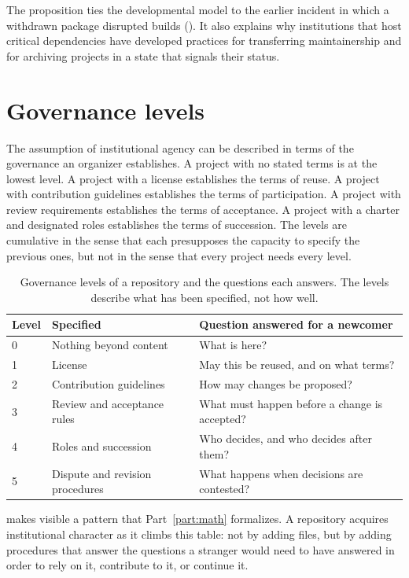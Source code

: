 \documentclass[11pt,twoside,openright]{book}
\theoremstyle{plain}
\theoremstyle{definition}
\theoremstyle{remark}
\begin{document}
The proposition ties the developmental model to the earlier incident in which a withdrawn package disrupted builds (). It also explains why institutions that host critical dependencies have developed practices for transferring maintainership and for archiving projects in a state that signals their status.

\section{Governance levels}

The assumption of institutional agency can be described in terms of the governance an organizer establishes. A project with no stated terms is at the lowest level. A project with a license establishes the terms of reuse. A project with contribution guidelines establishes the terms of participation. A project with review requirements establishes the terms of acceptance. A project with a charter and designated roles establishes the terms of succession. The levels are cumulative in the sense that each presupposes the capacity to specify the previous ones, but not in the sense that every project needs every level.

\begin{table}[t]
\centering
\caption{Governance levels of a repository and the questions each answers. The levels describe what has been specified, not how well.}
\label{tab:govlevels}
\small
\begin{tabular}{lll}
\toprule
Level & Specified & Question answered for a newcomer \\
\midrule
0 & Nothing beyond content & What is here? \\
1 & License & May this be reused, and on what terms? \\
2 & Contribution guidelines & How may changes be proposed? \\
3 & Review and acceptance rules & What must happen before a change is accepted? \\
4 & Roles and succession & Who decides, and who decides after them? \\
5 & Dispute and revision procedures & What happens when decisions are contested? \\
\bottomrule
\end{tabular}
\end{table}

 makes visible a pattern that Part~\ref{part:math} formalizes. A repository acquires institutional character as it climbs this table: not by adding files, but by adding procedures that answer the questions a stranger would need to have answered in order to rely on it, contribute to it, or continue it.
\end{document}
